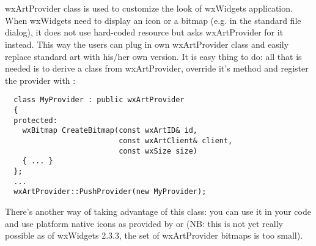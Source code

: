%
%

\section{}\label{wxartprovider}

wxArtProvider class is used to customize the look of wxWidgets application.
When wxWidgets need to display an icon or a bitmap (e.g. in the standard file
dialog), it does not use hard-coded resource but asks wxArtProvider for it
instead. This way the users can plug in own wxArtProvider class and easily
replace standard art with his/her own version. It is easy thing to do: all
that is needed is to derive a class from wxArtProvider, override it's
 method and register the
provider with
:

\begin{verbatim}
  class MyProvider : public wxArtProvider
  {
  protected:
    wxBitmap CreateBitmap(const wxArtID& id, 
                          const wxArtClient& client,
                          const wxSize size)
    { ... }
  };
  ...
  wxArtProvider::PushProvider(new MyProvider);
\end{verbatim}

There's another way of taking advantage of this class: you can use it in your code and use
platform native icons as provided by
 or 
 (NB: this is not yet really
possible as of wxWidgets 2.3.3, the set of wxArtProvider bitmaps is too
small). 

\label{artprovideridentifying}

